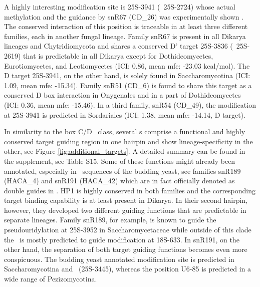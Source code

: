 A highly interesting modification site is 25S-3941 (\sce\ 25S-2724)
whose actual methylation and the guidance by snR67 (CD\_26) was
experimentally shown \cite{Lowe:1999}. The conserved interaction of
this position is traceable in at least three different families, each
in another fungal lineage. Family snR67 is present in all Dikarya
lineages and Chytridiomycota and shares a conserved D' target 25S-3836
(\sce\ 25S-2619) that is predictable in all Dikarya except for
Dothideomycetes, Eurotiomycetes, and Leotiomycetes (ICI: 0.86, mean
mfe: -23.03 kcal/mol). The D target 25S-3941, on the other hand, is
solely found in Saccharomycotina (ICI: 1.09, mean mfe: -15.34). Family
snR51 (CD\_6) is found to share this target as a conserved D box
interaction in Onygenales and in a part of Dothideomycetes (ICI: 0.36,
mean mfe: -15.46). In a third family, snR54 (CD\_49), the modification
at 25S-3941 is predicted in Sordariales (ICI: 1.38, mean mfe: -14.14,
D target).

In similarity to the box C/D \sno\ class, several \haca s comprise a
functional and highly conserved target guiding region in one hairpin
and show lineage-specificity in the other, see Figure
\ref{fig:additional_targets}.  A detailed summary can be found in the
supplement, see Table S15. Some of these functions might already been
annotated, especially in \sno\ sequences of the budding yeast, see
families snR189 (HACA\_4) and snR191 (HACA\_42) which are in fact
officially denoted as double guides in \sce.  HP1 is highly conserved
in both families and the corresponding target binding capability is at
least present in Dikarya. In their second hairpin, however, they
developed two different guiding functions that are predictable in
separate lineages. Family snR189, for example, is known to guide the
pseudouridylation at 25S-3952 in Saccharomycetaceae while outside of
this clade the \sno\ is mostly predicted to guide modification at
18S-633. In snR191, on the other hand, the separation of both target
guiding functions becomes even more conspicuous. The budding yeast
annotated modification site is predicted in Saccharomycotina and \Tde\
(25S-3445), whereas the position U6-85 is predicted in a wide range of
Pezizomycotina.

